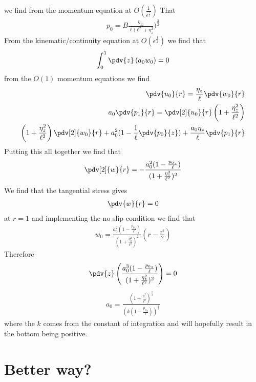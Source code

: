 \documentclass[12pt]{article}
\newcommand{\rt}{^{\frac{1}{2}}}
\begin{document}
we find from the momentum equation at $O(\frac{1}{\epsilon\rt})$
That 
\begin{align}
p_0 = B\frac{\eta_{zz}}{\ell(\ell^2+\eta_z^2})^{\frac{3}{2}}
\end{align}
From the kinematic/continuity equation at $O(\epsilon\rt)$ we find that \begin{align}
\int_0^1\pdv{z}\left(a_0w_0\right) = 0
\end{align}
from the $O(1)$ momentum equations we find
\begin{align}
\pdv{u_0}{r}= \frac{\eta_z}{\ell}\pdv{w_0}{r}\\
a_0\pdv{p_1}{r} = \pdv[2]{u_0}{r}\left(1+\frac{\eta_z^2}{\ell^2}\right)\\
\left(1+\frac{\eta_z^2}{\ell^2}\right)\pdv[2]{w_0}{r}+a_0^2(1-\frac{1}{\ell}\pdv{p_0}{z})+\frac{a_0\eta_z}{\ell}\pdv{p_1}{r}
\end{align} 
Putting this all together we find that 
\begin{align}
\pdv[2]{w}{r} = -\frac{a_0^2(1-\frac{{p_0}_z}{\ell})}{(1+\frac{\eta_z^2}{\ell^2})^2}
\end{align}
We find that the tangential stress gives
\begin{align}
\pdv{w}{r} =0 
\end{align}
at $r=1$ and implementing the no slip condition we find that 
\begin{align}
w_0 =\frac{a_0^2(1-\frac{{p_0}_z}{\ell})}{(1+\frac{\eta_z^2}{\ell^2})^2}\left(r-\frac{r^2}{2}\right)
\end{align}
Therefore 
\begin{align}
\pdv{z}\left(\frac{a_0^3(1-\frac{{p_0}_z}{\ell})}{(1+\frac{\eta_z^2}{\ell^2})^2}\right) =0
\end{align}
\begin{align}
a_0 = \frac{(1+\frac{\eta_z^2}{\ell^2})^{\frac{2}{3}}}{(k(1-\frac{{p_0}_z}{\ell}))^{\frac{1}{3}}}
	\end{align}
	where the $k$ comes from the constant of integration and will hopefully result in the bottom being positive.
	
	\section{Better way?}
	
\end{document}
